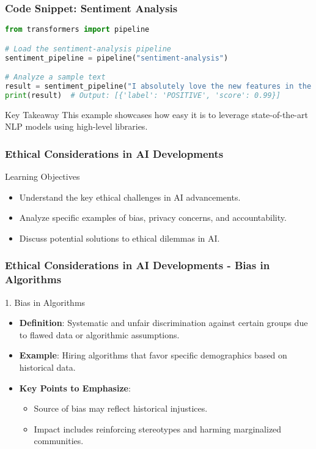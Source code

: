 \documentclass[aspectratio=169]{beamer}
\begin{document}
\begin{frame}[fragile]
    \frametitle{Code Snippet: Sentiment Analysis}
    \begin{lstlisting}[language=Python]
from transformers import pipeline

# Load the sentiment-analysis pipeline
sentiment_pipeline = pipeline("sentiment-analysis")

# Analyze a sample text
result = sentiment_pipeline("I absolutely love the new features in the latest update!")
print(result)  # Output: [{'label': 'POSITIVE', 'score': 0.99}]
    \end{lstlisting}
    \begin{block}{Key Takeaway}
        This example showcases how easy it is to leverage state-of-the-art NLP models using high-level libraries.
    \end{block}
\end{frame}

\begin{frame}[fragile]
    \frametitle{Ethical Considerations in AI Developments}
    
    \begin{block}{Learning Objectives}
        \begin{itemize}
            \item Understand the key ethical challenges in AI advancements.
            \item Analyze specific examples of bias, privacy concerns, and accountability.
            \item Discuss potential solutions to ethical dilemmas in AI.
        \end{itemize}
    \end{block}
\end{frame}

\begin{frame}[fragile]
    \frametitle{Ethical Considerations in AI Developments - Bias in Algorithms}
    
    \begin{block}{1. Bias in Algorithms}
        \begin{itemize}
            \item \textbf{Definition}: Systematic and unfair discrimination against certain groups due to flawed data or algorithmic assumptions.
            \item \textbf{Example}: Hiring algorithms that favor specific demographics based on historical data.
            \item \textbf{Key Points to Emphasize}:
            \begin{itemize}
                \item Source of bias may reflect historical injustices.
                \item Impact includes reinforcing stereotypes and harming marginalized communities.
            \end{itemize}
        \end{itemize}
    \end{block}
\end{frame}
\end{document}
